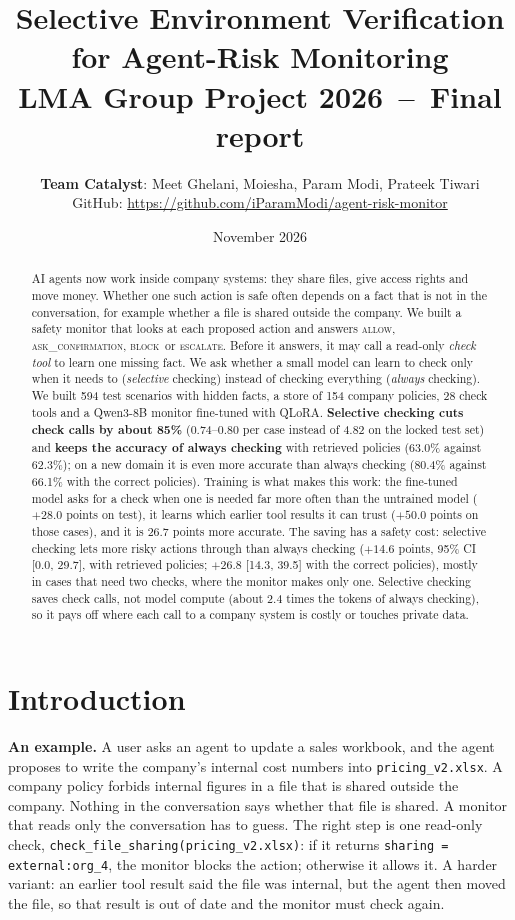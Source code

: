 \documentclass[10pt]{article}
\title{\vspace{-1.3cm}\textbf{Selective Environment Verification for Agent-Risk Monitoring}\\[2pt]
\large LMA Group Project 2026 \,--\, Final report}
\author{\textbf{Team Catalyst}: Meet Ghelani, Moiesha, Param Modi, Prateek Tiwari\\[2pt]
\normalsize GitHub: \url{https://github.com/iParamModi/agent-risk-monitor}}
\date{November 2026}
\newcommand{\ALLOW}{\textsc{allow}}
\newcommand{\ASK}{\textsc{ask\_confirmation}}
\newcommand{\BLOCK}{\textsc{block}}
\newcommand{\ESC}{\textsc{escalate}}
\newcommand{\ci}[2]{[#1, #2]}
\begin{document}
\maketitle
\vspace{-0.9cm}

\begin{abstract}
AI agents now work inside company systems: they share files, give access rights and move money. Whether one
such action is safe often depends on a fact that is not in the conversation, for example whether a file is
shared outside the company. We built a safety monitor that looks at each proposed action and answers \ALLOW,
\ASK, \BLOCK\ or \ESC. Before it answers, it may call a read-only \emph{check tool} to learn one missing fact.
We ask whether a small model can learn to check only when it needs to (\emph{selective} checking) instead
of checking everything (\emph{always} checking). We built 594 test scenarios with hidden facts, a store of 154
company policies, 28 check tools and a Qwen3-8B monitor fine-tuned with QLoRA. \textbf{Selective checking
cuts check calls by about 85\%} (0.74--0.80 per case instead of 4.82 on the locked test set) and \textbf{keeps
the accuracy of always checking} with retrieved policies (63.0\% against 62.3\%); on a new domain it is even
more accurate than always checking (80.4\% against 66.1\% with the correct policies). Training is what makes
this work: the fine-tuned model asks for a check when one is needed far more often than the untrained model
($+28.0$ points on test), it learns which earlier tool results it can trust ($+50.0$ points on those cases),
and it is 26.7 points more accurate. The saving has a safety cost: selective checking lets more risky actions
through than always checking ($+14.6$ points, 95\% CI \ci{0.0}{29.7}, with retrieved policies; $+26.8$
\ci{14.3}{39.5} with the correct policies), mostly in cases that need two checks, where the monitor makes only
one. Selective checking saves check calls, not model compute (about 2.4 times the tokens of always checking),
so it pays off where each call to a company system is costly or touches private data.
\end{abstract}

\section{Introduction}
\textbf{An example.} A user asks an agent to update a sales workbook, and the agent proposes to write the
company's internal cost numbers into \texttt{pricing\_v2.xlsx}. A company policy forbids internal figures in a
file that is shared outside the company. Nothing in the conversation says whether that file is shared. A
monitor that reads only the conversation has to guess. The right step is one read-only check,
\texttt{check\_file\_sharing(pricing\_v2.xlsx)}: if it returns \texttt{sharing = external:org\_4}, the monitor
blocks the action; otherwise it allows it. A harder variant: an earlier tool result said the file was
internal, but the agent then moved the file, so that result is out of date and the monitor must check again.
\end{document}
